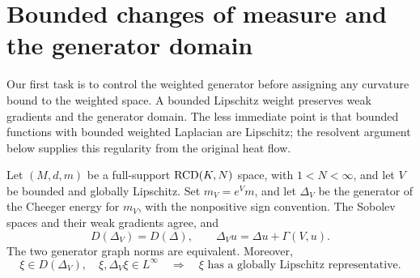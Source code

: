 \section{Bounded changes of measure and the generator domain}
\label{sec:drift}

Our first task is to control the weighted generator before assigning
any curvature bound to the weighted space. A bounded Lipschitz weight
preserves weak gradients and the generator domain. The less immediate
point is that bounded functions with bounded weighted Laplacian are
Lipschitz; the resolvent argument below supplies this regularity from
the original heat flow.

\begin{lemma}
\label{weight:resolvent}
Let \((M,d,m)\) be a full-support \(\mathrm{RCD}(K,N)\) space, with \(1<N<\infty\), and
let \(V\) be bounded and globally Lipschitz. Set
\(m_V=e^V m\), and let \(\Delta_V\) be the generator of the
Cheeger energy for \(m_V\), with the nonpositive sign convention.
The Sobolev spaces and their weak gradients agree, and
\begin{equation}
\label{weight:generator}
D(\Delta_V)=D(\Delta),\qquad
\Delta_Vu=\Delta u+\Gamma(V,u).
\end{equation}
The two generator graph norms are equivalent. Moreover,
\begin{equation}
\label{weight:multiplier-class}
\xi\in D(\Delta_V),\quad
\xi,\Delta_V\xi\in L^\infty
\quad\Longrightarrow\quad
\xi\text{ has a globally Lipschitz representative}.
\end{equation}
\end{lemma}

